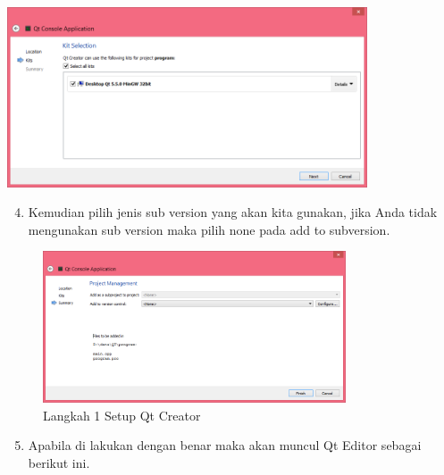 \begin{center}

\includegraphics[width=0.8\textwidth]{../manuscript/images/qt-console-aplication-3.PNG}

\end{center}

\begin{enumerate}

\setcounter{enumi}{3}

\item
  Kemudian pilih jenis sub version yang akan kita gunakan, jika Anda
  tidak mengunakan sub version maka pilih none pada add to subversion.
\end{enumerate}

\begin{figure}[htbp]
\centering
\includegraphics[width=0.8\textwidth]{../manuscript/images/qt-console-aplication-4.PNG}
\caption{Langkah 1 Setup Qt Creator }
\end{figure}

\begin{enumerate}

\setcounter{enumi}{4}

\item
  Apabila di lakukan dengan benar maka akan muncul Qt Editor sebagai
  berikut ini.
\end{enumerate}

